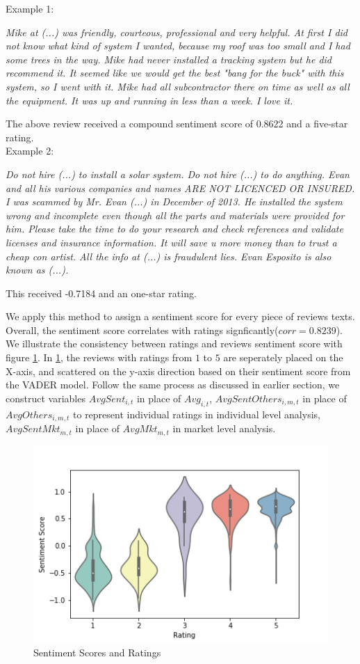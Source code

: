 \documentclass[msom,blindrev]{informs3}
\begin{document}
 Example 1: 
 \begin{displayquote}
\textit{Mike at (...) was friendly, courteous, professional and very helpful.  At first I did not know what kind of system I wanted, because my roof was too small and I had some trees in the way.  Mike had never installed a tracking system but he did recommend it.  It seemed like we would get the best "bang for the buck" with this system, so I went with it.  Mike had all subcontractor there on time as well as all the equipment.  It was up and running in less than a week.  I love it.  }
\end{displayquote} 
The above review received a compound sentiment score of 0.8622 and a five-star rating. \\ 
 Example 2: 
\begin{displayquote}
\textit{Do not hire (...)  to install a solar system. Do not hire (...) to do anything. Evan   and all his various companies and names  ARE NOT LICENCED OR INSURED. I was scammed by Mr. Evan (...) in December of 2013. He installed the system wrong and incomplete even though all the parts and materials were provided for him. Please take the time to do your research and check references and validate licenses and insurance information. It will save u more money than to trust a cheap con artist. All the info at (...)  is fraudulent lies. Evan Esposito is also known as (...).}
\end{displayquote}
This received -0.7184 and an one-star rating.  

We apply this method to assign a sentiment score for every piece of reviews texts. Overall, the sentiment score correlates with ratings signficantly($corr = 0.8239$). We illustrate the consistency between ratings and reviews sentiment score with figure \ref{sent_score_violin}. In \ref{sent_score_violin}, the reviews with ratings from $1$ to $5$ are seperately placed on the X-axis, and scattered on the y-axis direction based on their sentiment score from the VADER model. Follow the same process as discussed in earlier section, we construct variables $AvgSent_{i,t}$ in place of $Avg_{i,t}$, $AvgSentOthers_{i,m,t}$ in place of $AvgOthers_{i,m,t}$ to represent individual ratings in individual level analysis, $AvgSentMkt_{m,t}$ in place of $AvgMkt_{m,t}$ in market level analysis.  
\begin{figure}
	\centering
	\includegraphics[width=0.7\linewidth]{sentscore_violin.png}
	\caption{Sentiment Scores and Ratings}
	\label{sent_score_violin}
\end{figure}
\end{document}
